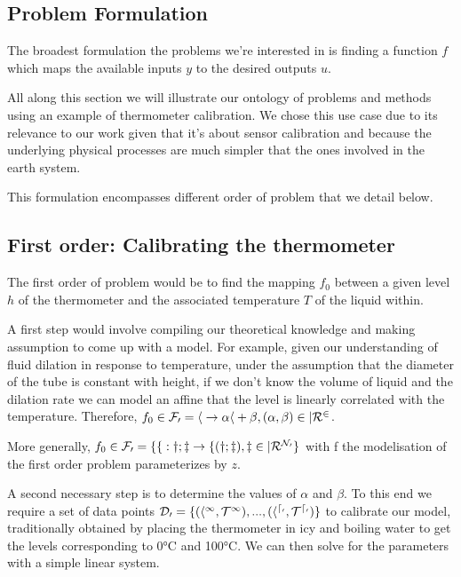\begin{bibunit}
{{{{\section{Problem Formulation}
\label{sec:chap1_problem_form}



The broadest formulation the problems we're interested in is finding a function $f$ which maps the available inputs $y$ to the desired outputs $u$.





All along this section we will illustrate our ontology of problems and methods using an example of thermometer calibration. We chose this use case due to its relevance to our work given that it's about sensor calibration and because the underlying physical processes are much simpler that the ones involved in the earth system.

This formulation encompasses different order of problem that we detail below.

\subsection{First order: Calibrating the thermometer}
  \label{ssec:firstorder}
The first order of problem would be to find the mapping $f_0$ between a given level $h$ of the thermometer and the associated temperature $T$ of the liquid within.

A first step would involve compiling our theoretical knowledge and making assumption to come up with a model. For example, given our understanding of fluid dilation in response to temperature, under the assumption that the diameter of the tube is constant with height, if we don't know the volume of liquid and the dilation rate we can model an affine  that the level is linearly correlated with the temperature. Therefore, $f_0 \in \cal{F}_0 = { h \to \alpha h + \beta , (\alpha, \beta) \in |R^2 }$.

  More generally, $f_0 \in \cal{F}_0 = \{ f: y; z \to f(y; z), z \in |R^{N_0} \}$ with f the modelisation of the first order problem parameterizes by $z$.

  A second necessary step is to determine the values of $\alpha$ and $\beta$. To this end we require a set of data points $\cal{D}_0 = \{(h^1, T^1), ..., (h^{d_0}, T^{d_0})\}$ to calibrate our model, traditionally obtained by placing the thermometer in icy and boiling water to get the levels corresponding to 0°C and 100°C. We can then solve for the parameters with a simple linear system.


}}}}
\end{bibunit}

